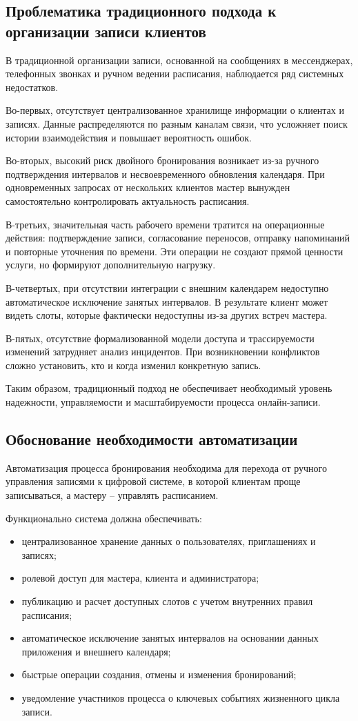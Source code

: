 \subsection{Проблематика традиционного подхода к организации записи клиентов}

В традиционной организации записи, основанной на сообщениях в мессенджерах, телефонных звонках и ручном ведении расписания, наблюдается ряд системных недостатков.

Во-первых, отсутствует централизованное хранилище информации о клиентах и записях. Данные распределяются по разным каналам связи, что усложняет поиск истории взаимодействия и повышает вероятность ошибок.

Во-вторых, высокий риск двойного бронирования возникает из-за ручного подтверждения интервалов и несвоевременного обновления календаря. При одновременных запросах от нескольких клиентов мастер вынужден самостоятельно контролировать актуальность расписания.

В-третьих, значительная часть рабочего времени тратится на операционные действия: подтверждение записи, согласование переносов, отправку напоминаний и повторные уточнения по времени. Эти операции не создают прямой ценности услуги, но формируют дополнительную нагрузку.

В-четвертых, при отсутствии интеграции с внешним календарем недоступно автоматическое исключение занятых интервалов. В результате клиент может видеть слоты, которые фактически недоступны из-за других встреч мастера.

В-пятых, отсутствие формализованной модели доступа и трассируемости изменений затрудняет анализ инцидентов. При возникновении конфликтов сложно установить, кто и когда изменил конкретную запись.

Таким образом, традиционный подход не обеспечивает необходимый уровень надежности, управляемости и масштабируемости процесса онлайн-записи.

\subsection{Обоснование необходимости автоматизации}

Автоматизация процесса бронирования необходима для перехода от ручного управления записями к цифровой системе, в которой клиентам проще записываться, а мастеру -- управлять расписанием.

Функционально система должна обеспечивать:
\begin{itemize}
\item централизованное хранение данных о пользователях, приглашениях и записях;
\item ролевой доступ для мастера, клиента и администратора;
\item публикацию и расчет доступных слотов с учетом внутренних правил расписания;
\item автоматическое исключение занятых интервалов на основании данных приложения и внешнего календаря;
\item быстрые операции создания, отмены и изменения бронирований;
\item уведомление участников процесса о ключевых событиях жизненного цикла записи.
\end{itemize}


